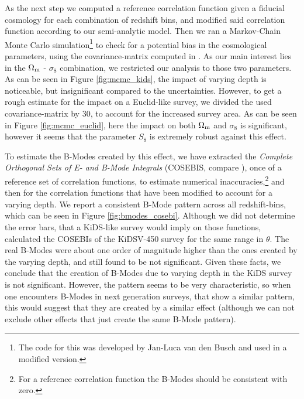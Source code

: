 As the next step we computed a reference correlation function given a fiducial cosmology for each combination of redshift bins, and modified said correlation function according to our semi-analytic model. Then we ran a Markov-Chain Monte Carlo simulation\footnote{The code for this was developed by Jan-Luca van den Busch and used in a modified version.} to check for a potential bias in the cosmological parameters, using the covariance-matrix computed in \citet{2017MNRAS.465.1454H}. As our main interest lies in the $\Omega_{\rm m}$ - $\sigma_8$ combination, we restricted our analysis to those two parameters.  As can be seen in Figure \ref{fig:mcmc_kids}, the impact of varying depth is noticeable, but insignificant compared to the uncertainties. However, to get a rough estimate for the impact on a Euclid-like survey, we divided the used covariance-matrix by 30, to account for the increased survey area. As can be seen in Figure \ref{fig:mcmc_euclid}, here the impact on both $\Omega_{\rm m}$ and $\sigma_8$ is significant, however it seems that the parameter $S_8$ is extremely robust against this effect.

To estimate the B-Modes created by this effect, we have extracted the \emph{Complete Orthogonal Sets of E- and B-Mode Integrals} (COSEBIS, compare \citet{2010A&A...520A.116S}), once of a reference set of correlation functions, to estimate numerical inaccuracies,\footnote{For a reference correlation function the B-Modes should be consistent with zero.} and then for the correlation functions that have been modified to account for a varying depth. We report a consistent B-Mode pattern across all redshift-bins, which can be seen in Figure \ref{fig:bmodes_cosebi}. Although we did not determine the error bars, that a KiDS-like survey would imply on those functions, \citet{2018arXiv181110596A} calculated the COSEBIs of the KiDSV-450 survey for the same range in $\theta$. The real B-Modes were about one order of magnitude higher than the ones created by the varying depth, and still found to be not significant. Given these facts, we conclude that the creation of B-Modes due to varying depth in the KiDS survey is not significant. However, the pattern seems to be very characteristic, so when one encounters B-Modes in next generation surveys, that show a similar pattern, this would suggest that they are created by a similar effect (although we can not exclude other effects that just create the same B-Mode pattern).

